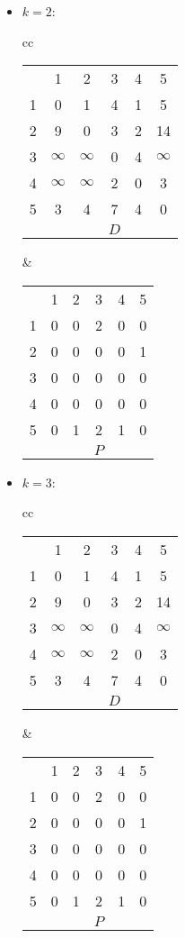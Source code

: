 \documentclass[natbib,12pt]{article}
\begin{document}
\begin{itemize}
				\item $k=2$:
		\begin{tabular}{cc}
			\begin{tabular}{cccccc}
				& 1 & 2 & 3 & 4 & 5 \\ \cline{2-6} 
				\multicolumn{1}{l|}{1} & 0 & 1 & 4 & 1 & 5 \\
				\multicolumn{1}{l|}{2} & 9 & 0 & 3 & 2 & 14 \\
				\multicolumn{1}{l|}{3} & $\infty$ & $\infty$ & 0 & 4 & $\infty$ \\
				\multicolumn{1}{l|}{4} & $\infty$ & $\infty$ & 2 & 0 & 3 \\
				\multicolumn{1}{l|}{5} & 3 & 4 & 7 & 4 & 0 \\
				&&&$D$&&
			\end{tabular}
			&
			\begin{tabular}{cccccc}
				& 1 & 2 & 3 & 4 & 5 \\ \cline{2-6} 
				\multicolumn{1}{l|}{1} & 0 & 0 & 2 & 0 & 0 \\
				\multicolumn{1}{l|}{2} & 0 & 0 & 0 & 0 & 1 \\
				\multicolumn{1}{l|}{3} & 0 & 0 & 0 & 0 & 0 \\
				\multicolumn{1}{l|}{4} & 0 & 0 & 0 & 0 & 0 \\
				\multicolumn{1}{l|}{5} & 0 & 1 & 2 & 1 & 0 \\
				&&&$P$&&
			\end{tabular}
		\end{tabular}
	
					\item $k=3$:
	\begin{tabular}{cc}
		\begin{tabular}{cccccc}
			& 1 & 2 & 3 & 4 & 5 \\ \cline{2-6} 
			\multicolumn{1}{l|}{1} & 0 & 1 & 4 & 1 & 5 \\
			\multicolumn{1}{l|}{2} & 9 & 0 & 3 & 2 & 14 \\
			\multicolumn{1}{l|}{3} & $\infty$ & $\infty$ & 0 & 4 & $\infty$ \\
			\multicolumn{1}{l|}{4} & $\infty$ & $\infty$ & 2 & 0 & 3 \\
			\multicolumn{1}{l|}{5} & 3 & 4 & 7 & 4 & 0 \\
			&&&$D$&&
		\end{tabular}
		&
		\begin{tabular}{cccccc}
			& 1 & 2 & 3 & 4 & 5 \\ \cline{2-6} 
			\multicolumn{1}{l|}{1} & 0 & 0 & 2 & 0 & 0 \\
			\multicolumn{1}{l|}{2} & 0 & 0 & 0 & 0 & 1 \\
			\multicolumn{1}{l|}{3} & 0 & 0 & 0 & 0 & 0 \\
			\multicolumn{1}{l|}{4} & 0 & 0 & 0 & 0 & 0 \\
			\multicolumn{1}{l|}{5} & 0 & 1 & 2 & 1 & 0 \\
			&&&$P$&&
		\end{tabular}
	\end{tabular}


\end{itemize}
\end{document}
